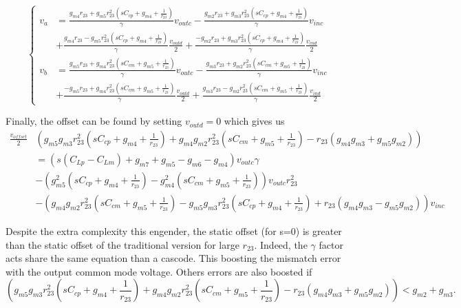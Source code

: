 \[
\begin{cases}
v_a &= \frac{g_{m4}r_{23}+g_{m5}r_{23}^2\left(sC_{cp}+g_{m4}+\frac{1}{r_{23}}\right)}{\gamma} v_{outc} - \frac{g_{m2}r_{23}+g_{m3}r_{23}^2\left(sC_{cp}+g_{m4}+\frac{1}{r_{23}}\right)}{\gamma} v_{inc} \\
&+ \frac{g_{m4}r_{23}-g_{m5}r_{23}^2\left(sC_{cp}+g_{m4}+\frac{1}{r_{23}}\right)}{\gamma} \frac{v_{outd}}{2} + \frac{-g_{m2}r_{23}+g_{m3}r_{23}^2\left(sC_{cp}+g_{m4}+\frac{1}{r_{23}}\right)}{\gamma} \frac{v_{ind}}{2} \\
v_b &= \frac{g_{m5}r_{23}+g_{m4}r_{23}^2\left(sC_{cm}+g_{m5}+\frac{1}{r_{23}}\right)}{\gamma} v_{outc} - \frac{g_{m3}r_{23}+g_{m2}r_{23}^2\left(sC_{cm}+g_{m5}+\frac{1}{r_{23}}\right)}{\gamma} v_{inc} \\
&+ \frac{-g_{m5}r_{23}+g_{m4}r_{23}^2\left(sC_{cm}+g_{m5}+\frac{1}{r_{23}}\right)}{\gamma} \frac{v_{outd}}{2} + \frac{g_{m3}r_{23}-g_{m2}r_{23}^2\left(sC_{cm}+g_{m5}+\frac{1}{r_{23}}\right)}{\gamma} \frac{v_{ind}}{2}
\end{cases}
\]

Finally, the offset can be found by setting \(v_{outd} = 0\) which gives us 
\small
\begin{align}
    \frac{v_{offset}}{2} & \left(g_{m5}g_{m3}r_{23}^2\left(sC_{cp}+g_{m4}+\frac{1}{r_{23}}\right)+g_{m4}g_{m2}r_{23}^2\left(sC_{cm}+g_{m5}+\frac{1}{r_{23}}\right)-r_{23}\left(g_{m4}g_{m3}+g_{m5}g_{m2} \right) \right) \\
 &= \left(s\left(C_{Lp}-C_{Lm}\right)+g_{m7}+g_{m5}-g_{m6}-g_{m4}\right) v_{outc}\gamma \nonumber \\
 &- \left(g_{m5}^2\left(sC_{cp}+g_{m4}+\frac{1}{r_{23}}\right)-g_{m4}^2\left(sC_{cm}+g_{m5}+\frac{1}{r_{23}}\right)\right) v_{outc}r_{23}^2  \nonumber \\
 &- \left(g_{m4}g_{m2}r_{23}^2\left(sC_{cm}+g_{m5}+\frac{1}{r_{23}}\right)-g_{m5}g_{m3}r_{23}^2\left(sC_{cp}+g_{m4}+\frac{1}{r_{23}}\right)+r_{23}\left(g_{m4}g_{m3}-g_{m5}g_{m2}\right) \right) v_{inc} \nonumber
\end{align}
\normalsize

Despite the extra complexity this engender, the static offset (for s=0) is greater than the static offset of the traditional version for large \(r_{23}\). Indeed, the \(\gamma\) factor acts share the same equation than a cascode. This boosting the mismatch error with the output common mode voltage. Others errors are also boosted if \small \[ \left(g_{m5}g_{m3}r_{23}^2\left(sC_{cp}+g_{m4}+\frac{1}{r_{23}}\right)+g_{m4}g_{m2}r_{23}^2\left(sC_{cm}+g_{m5}+\frac{1}{r_{23}}\right)-r_{23}\left(g_{m4}g_{m3}+g_{m5}g_{m2} \right) \right) < g_{m2}+g_{m3}.\]
\normalsize

